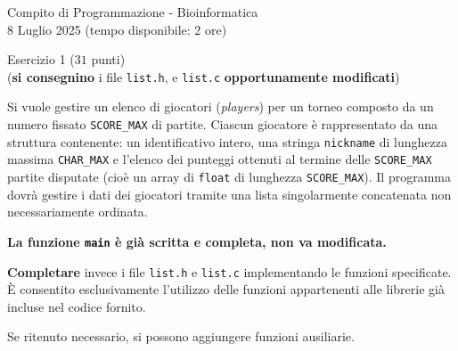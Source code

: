 \documentclass[12pt]{article}
\begin{document}
\begin{center}
  {\LARGE Compito di Programmazione - Bioinformatica}\\
  {8 Luglio 2025 (tempo disponibile: 2 ore)}
\end{center}

\vspace*{1ex}
\begin{center}{\Large Esercizio 1} ($31$ punti)\\
  (\textbf{si consegnino} i file \texttt{list.h}, e \texttt{list.c} \textbf{opportunamente modificati})
\end{center}

\vspace{10pt}
\noindent
Si vuole gestire un elenco di giocatori (\emph{players}) per un torneo composto
da un numero fissato \texttt{SCORE\_MAX} di partite.
Ciascun giocatore \`e rappresentato da una struttura contenente:
un identificativo intero, una stringa \texttt{nickname} di lunghezza massima \texttt{CHAR\_MAX}
e l'elenco dei punteggi ottenuti al termine delle \texttt{SCORE\_MAX} partite disputate
(cio\`e un array di \texttt{float} di lunghezza \texttt{SCORE\_MAX}).
Il programma dovr\`a gestire i dati dei giocatori tramite una lista singolarmente concatenata
non necessariamente ordinata.

\vspace{10pt}
\begin{mdframed}[backgroundcolor=blue!20!white]
\vspace*{-0.5ex}
\textbf{La funzione \texttt{main} \`e gi\`a scritta e completa, non va modificata.}

\vspace{5pt}
\noindent
\textbf{Completare} invece i file \texttt{list.h} e \texttt{list.c} implementando le funzioni specificate. \`E consentito esclusivamente l'utilizzo delle funzioni appartenenti alle librerie gi\`a incluse nel codice fornito. 

\noindent Se ritenuto necessario, si possono aggiungere funzioni ausiliarie.
\end{mdframed}
\end{document}

